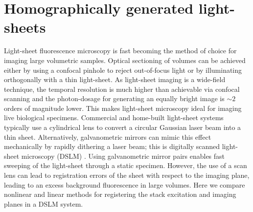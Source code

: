 
\chapter{Homographically generated light-sheets}

\ifpdf
    \graphicspath{{Chapter2/Figs/Raster/}{Chapter2/Figs/PDF/}{Chapter2/Figs/}}
\else
    \graphicspath{{Chapter2/Figs/Vector/}{Chapter2/Figs/}}
\fi

Light-sheet fluorescence microscopy is fast becoming the method of choice for imaging large volumetric samples.
Optical sectioning of volumes can be achieved either by using a confocal pinhole to reject out-of-focus light or by illuminating orthogonally with a thin light-sheet.
As light-sheet imaging is a wide-field technique, the temporal resolution is much higher than achievable via confocal scanning and the photon-dosage for generating an equally bright image is $\sim 2$ orders of magnitude lower.
This makes light-sheet microscopy ideal for imaging live biological specimens\cite{huisken_optical_2004-1}.
Commercial and home-built\cite{pitrone_openspim:_2013} light-sheet systems typically use a cylindrical lens to convert a circular Gaussian laser beam into a thin sheet.
Alternatively, galvanometric mirrors can mimic this effect mechanically by rapidly dithering a laser beam; this is digitally scanned light-sheet microscopy (DSLM)%
\cite{keller_fast_2010-1}.
Using galvanometric mirror pairs enables fast sweeping of the light-sheet through a static specimen.
However, the use of a scan lens can lead to registration errors of the sheet with respect to the imaging plane, leading to an excess background fluorescence in large volumes.
Here we compare nonlinear and linear methods for registering the stack excitation and imaging planes in a DSLM system.

